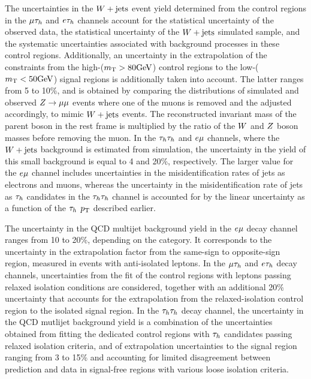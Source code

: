 The uncertainties in the $W+ \text{jets}$ event yield determined from the control regions in the $\mu\tau_{h}$ and $e\tau_{h}$ channels account for the statistical uncertainty of the observed data, the statistical uncertainty of the $W+ \text{jets}$ simulated sample, and the systematic uncertainties associated with background processes in these control regions. Additionally, an uncertainty in the extrapolation  of the constraints from the high-\MT ($m_\mathrm{T}>80\mathrm{GeV}$) control regions to the low-\MT ($m_\mathrm{T}<50\mathrm{GeV}$) signal regions is additionally taken into account. The latter ranges from 5 to 10\%, and is obtained by comparing the \MT distributions of simulated and observed $Z\to\mu\mu$ events where one of the muons is removed and the \etvecmiss adjusted accordingly, to mimic $W+\text{jets}$ events. The reconstructed invariant mass of the parent boson in the rest frame is multiplied by the ratio of the $W$ and $Z$ boson masses before removing the muon.
In the $\tau_{h}\tau_{h}$ and $e\mu$ channels, where the $W+\text{jets}$ background is estimated from simulation, the uncertainty in the yield of this small background is equal to 4 and 20\%, respectively. The larger value for the $e\mu$ channel includes uncertainties in the misidentification rates of jets as electrons and muons, whereas the uncertainty in the misidentification rate of jets as $\tau_{h}$ candidates in the $\tau_{h}\tau_{h}$ channel is accounted for by the linear uncertainty as a function of the $\tau_{h}$ $p_\mathrm{T}$ described earlier.

The uncertainty in the QCD multijet background yield in the $e\mu$ decay channel ranges from 10 to 20\%, depending on the category. It corresponds to the
uncertainty in the extrapolation factor from the same-sign to opposite-sign region, measured in events with anti-isolated leptons.
In the $\mu\tau_{h}$ and $e\tau_{h}$ decay channels, uncertainties from the fit of the control regions with leptons passing relaxed isolation conditions are
considered, together with an additional 20\% uncertainty that accounts for the extrapolation from the relaxed-isolation control region to the isolated signal region.
In the $\tau_{h}\tau_{h}$ decay channel, the uncertainty in the QCD mutlijet background yield is a combination of the uncertainties obtained from fitting the dedicated control regions with $\tau_{h}$ candidates passing relaxed isolation criteria, and of extrapolation uncertainties to the signal region ranging from 3 to 15\% and accounting for limited disagreement between prediction and data in signal-free regions with various loose isolation criteria.

